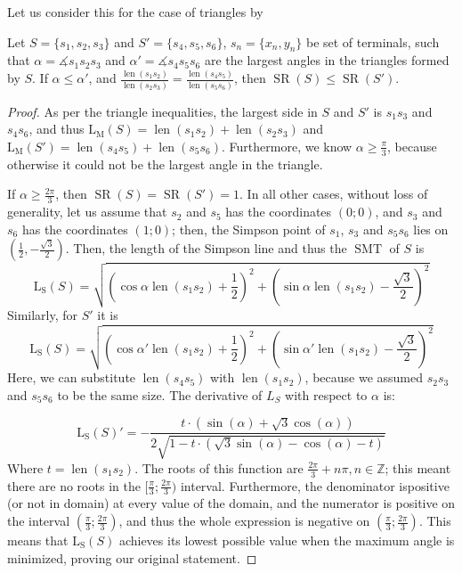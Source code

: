 \documentclass{mpaper}
\begin{document}
Let us consider this for the case of triangles by 
\begin{lemma}
  Let $S=\{s_1, s_2, s_3\}$ and $S'=\{s_4, s_5, s_6\}$, $s_n=\{x_n, y_n\}$ be set of terminals, such that  $\alpha=\measuredangle s_1s_2s_3$ and $\alpha'=\measuredangle s_4s_5s_6$ are the largest angles in the triangles formed by $S$.
   If
  $\alpha\allowbreak\leq\alpha'$,
  and $\allowbreak\frac{\operatorname{len}(s_1s_2)}{\operatorname{len}(s_2s_3)}\allowbreak=\allowbreak\frac{\operatorname{len}(s_4s_5)}{\operatorname{len}(s_5s_6)}$,
   then $\operatorname{SR}(S) \allowbreak\leq\allowbreak \operatorname{SR}(S')$.
\end{lemma}
\begin{proof}
  As per the triangle inequalities, the largest side in $S$ and $S'$ is $s_1s_3$ and $s_4s_6$, and thus $\operatorname{L_M}(S)=\operatorname{len}(s_1s_2)+\operatorname{len}(s_2s_3)$ and $\operatorname{L_M}(S')=\operatorname{len}(s_4s_5)+\operatorname{len}(s_5s_6)$. Furthermore, we know $\alpha\geq\frac{\pi}{3}$, because otherwise it could not be the largest angle in the triangle.

  If $\alpha\geq\frac{2\pi}{3}$, then $\operatorname{SR}(S)=\operatorname{SR}(S')=1$. In all other cases, without loss of generality, let us assume that $s_2$ and $s_5$ has the coordinates $(0; 0)$, and $s_3$ and $s_6$ has the coordinates $(1;0)$; then, the Simpson point of $s_1$, $s_3$ and $s_5s_6$ lies on $(\frac{1}{2}, -\frac{\sqrt{3}}{2})$. Then, the length of the Simpson line and thus the $\operatorname{SMT}$ of $S$ is
  \[
    \operatorname{L_S}(S) = \sqrt{(\cos\alpha\operatorname{len}(s_1s_2)+\frac{1}{2})^2+(\sin\alpha\operatorname{len}(s_1s_2)-\frac{\sqrt{3}}{2})^2}
  \]
  Similarly, for $S'$ it is
  \[
    \operatorname{L_S}(S) = \sqrt{(\cos\alpha'\operatorname{len}(s_1s_2)+\frac{1}{2})^2+(\sin\alpha'\operatorname{len}(s_1s_2)-\frac{\sqrt{3}}{2})^2}
  \]
  Here, we can substitute $\operatorname{len}(s_4s_5)$ with $\operatorname{len}(s_1s_2)$, because we assumed $s_2s_3$ and $s_5s_6$ to be the same size. The derivative of $L_S$ with respect to $\alpha$ is:

  \[
    \operatorname{L_S}(S)' = -\dfrac{t\cdot\left(\sin\left({\alpha}\right)+\sqrt{3}\cos\left({\alpha}\right)\right)}{2\sqrt{1-t\cdot\left(\sqrt{3}\sin\left({\alpha}\right)-\cos\left({\alpha}\right)-t\right)}}
  \]
  Where $t=\operatorname{len}(s_1s_2)$. The roots of this function are $\frac{2\pi}{3}+n\pi, n\in\mathbb{Z}$; this meant there are no roots in the $[\frac{\pi}{3};\frac{2\pi}{3})$ interval. Furthermore, the denominator ispositive (or not in domain) at every value of the domain, and the numerator is positive on the interval $(\frac{\pi}{3};\frac{2\pi}{3})$, and thus the whole expression is negative on $(\frac{\pi}{3};\frac{2\pi}{3})$. This means that $\operatorname{L_S}(S)$ achieves its lowest possible value when the maximum angle is minimized, proving our original statement. 
\end{proof}
\end{document}

